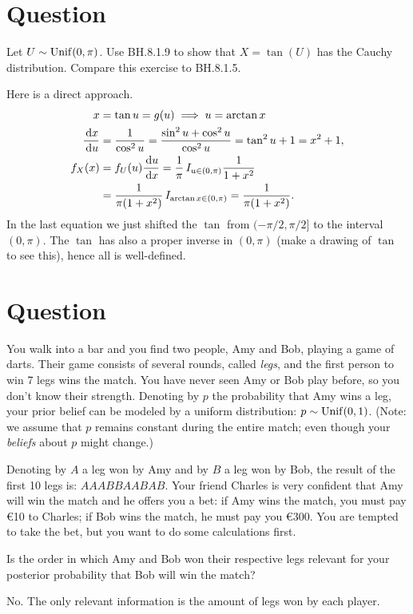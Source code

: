 \section{Question}

\begin{exercise}
Let $U \sim  \mathrm{Unif}(0, \pi)$.
Use  BH.8.1.9 to show that $X = \tan(U)$ has the Cauchy distribution. Compare this exercise to BH.8.1.5.
\begin{solution}
Here is a direct approach.
  \begin{align}
    \label{eq:20}
x&=\tan u = g(u) \implies u = \arctan x\\
\frac{\,\textrm{d}x}{\,\textrm{d}u } &= \frac{1}{\cos^{2} u} = \frac{\sin^{2}u + \cos^{2}u }{\cos^{2}u} = \tan^{2} u + 1 = x^{2} + 1,\\
f_{X}(x) &= f_{U}(u) \frac{\,\textrm{d}u}{\,\textrm{d}x} = \frac{1}{\pi}\,I_{u\in (0, \pi)} \frac{1}{1+x^{2}} \\
&=\frac{1}{\pi(1+x^{2})}\,I_{\arctan x \in (0, \pi)} =\frac{1}{\pi(1+x^{2})}.
  \end{align}
  In the last equation we just shifted the $\tan$ from $(-\pi/2, \pi/2]$ to the interval $(0, \pi)$.
  The $\tan$ has also a proper inverse in $(0,\pi)$ (make a drawing of $\tan$ to see this), hence all is well-defined.
\end{solution}
\end{exercise}

\section{Question}

You walk into a bar and you find two people, Amy and Bob, playing a game of darts. Their game consists of several rounds, called \textit{legs}, and the first person to win 7 legs wins the match. You have never seen Amy or Bob play before, so you don't know their strength. Denoting by $p$ the probability that Amy wins a leg, your prior belief can be modeled by a uniform distribution: $p \sim \mathrm{Unif}(0,1)$.  (Note: we assume that $p$ remains constant during the entire match; even though your \textit{beliefs} about $p$ might change.)

Denoting by $A$ a leg won by Amy and by $B$ a leg won by Bob, the result of the first 10 legs is: $AAABBAABAB$. Your friend Charles is very confident that Amy will win the match and he offers you a bet: if Amy wins the match, you must pay €10 to Charles; if Bob wins the match, he must pay you €300. You are tempted to take the bet, but you want to do some calculations first.
\begin{exercise}
Is the order in which Amy and Bob won their respective legs relevant for your posterior probability that Bob will win the match?
\begin{solution}
No. The only relevant information is the amount of legs won by each player.
\end{solution}
\end{exercise}

